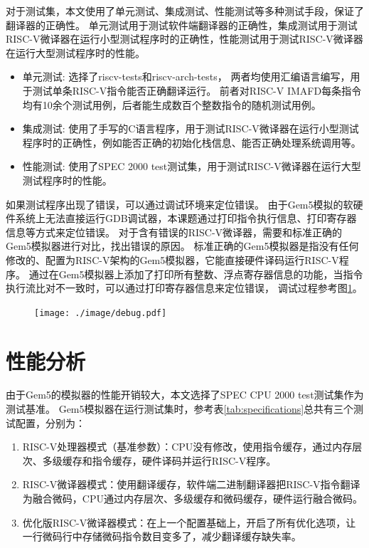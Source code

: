 对于测试集，本文使用了单元测试、集成测试、性能测试等多种测试手段，保证了翻译器的正确性。
单元测试用于测试软件端翻译器的正确性，集成测试用于测试RISC-V微译器在运行小型测试程序时的正确性，性能测试用于测试RISC-V微译器在运行大型测试程序时的性能。
\begin{itemize}
\item 单元测试: 选择了riscv-tests\cite{riscv-tests}和riscv-arch-tests\cite{riscv-arch-tests}，
两者均使用汇编语言编写，用于测试单条RISC-V指令能否正确翻译运行。
前者对RISC-V IMAFD每条指令均有10余个测试用例，后者能生成数百个整数指令的随机测试用例。
\item 集成测试: 使用了手写的C语言程序，用于测试RISC-V微译器在运行小型测试程序时的正确性，例如能否正确的初始化栈信息、能否正确处理系统调用等。
\item 性能测试: 使用了SPEC 2000 test测试集，用于测试RISC-V微译器在运行大型测试程序时的性能。
\end{itemize}

如果测试程序出现了错误，可以通过调试环境来定位错误。
由于Gem5模拟的软硬件系统上无法直接运行GDB调试器，本课题通过打印指令执行信息、打印寄存器信息等方式来定位错误。
对于含有错误的RISC-V微译器，需要和标准正确的Gem5模拟器进行对比，找出错误的原因。
标准正确的Gem5模拟器是指没有任何修改的、配置为RISC-V架构的Gem5模拟器，它能直接硬件译码运行RISC-V程序。
通过在Gem5模拟器上添加了打印所有整数、浮点寄存器信息的功能，当指令执行流比对不一致时，可以通过打印寄存器信息来定位错误，
调试过程参考图\ref{img:debug}。

\begin{figure}[!htbp]
  \centering
  \texttt{[image: ./image/debug.pdf]}
  \label{img:debug}
\end{figure}

\section{性能分析}
由于Gem5的模拟器的性能开销较大，本文选择了SPEC CPU 2000 test测试集作为测试基准。
Gem5模拟器在运行测试集时，参考表\ref{tab:specifications}总共有三个测试配置，分别为：
\begin{enumerate}
  \item RISC-V处理器模式（基准参数）：CPU没有修改，使用指令缓存，通过内存层次、多级缓存和指令缓存，硬件译码并运行RISC-V程序。
  \item RISC-V微译器模式：使用翻译缓存，软件端二进制翻译器把RISC-V指令翻译为融合微码，CPU通过内存层次、多级缓存和微码缓存，硬件运行融合微码。
  \item 优化版RISC-V微译器模式：在上一个配置基础上，开启了所有优化选项，让一行微码行中存储微码指令数目变多了，减少翻译缓存缺失率。
\end{enumerate}

